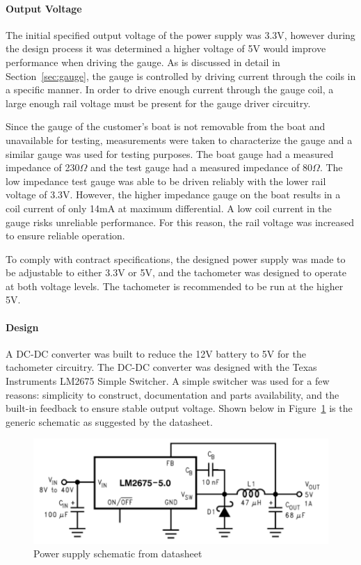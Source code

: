 \documentclass[11pt]{article}
\providecommand{\DIFaddtex}[1]{{\protect\color{blue}\uwave{#1}}} %
\providecommand{\DIFaddFL}[1]{\DIFadd{#1}} %
\providecommand{\DIFaddbeginFL}{} %
\providecommand{\DIFaddendFL}{} %
\providecommand{\DIFadd}[1]{\texorpdfstring{\DIFaddtex{#1}}{#1}} %
\newcommand{\DIFaddincludegraphics}[2][]{{\color{blue}\fbox{\DIFOincludegraphics[#1]{#2}}}} %
\DeclareRobustCommand{\DIFaddbeginFL}{\DIFOaddbeginFL \let\includegraphics\DIFaddincludegraphics} %
\DeclareRobustCommand{\DIFaddendFL}{\DIFOaddendFL \let\includegraphics\DIFOincludegraphics} %
\begin{document}
\paragraph{Output Voltage}
The initial specified output voltage of the power supply was 3.3V, however during the design process it was determined a higher voltage of 5V would improve performance when driving the gauge. As is discussed in detail in Section~\ref{sec:gauge}, the gauge is controlled by driving current through the coils in a specific manner. In order to drive enough current through the gauge coil, a large enough rail voltage must be present for the gauge driver circuitry. 

Since the gauge of the customer's boat is not removable from the boat and unavailable for testing, measurements were taken to characterize the gauge and a similar gauge was used for testing purposes. The boat gauge had a measured impedance of 230$\Omega$ and the test gauge had a measured impedance of 80$\Omega$. The low impedance test gauge was able to be driven reliably with the lower rail voltage of 3.3V. However, the higher impedance gauge on the boat results in a coil current of only 14mA at maximum differential. A low coil current in the gauge risks unreliable performance. For this reason, the rail voltage was increased to ensure reliable operation.

To comply with contract specifications, the designed power supply was made to be adjustable to either 3.3V or 5V, and the tachometer was designed to operate at both voltage levels. The tachometer is recommended to be run at the higher 5V.

\paragraph{Design}
A DC-DC converter was built to reduce the 12V battery to 5V for the tachometer circuitry. The DC-DC converter was designed with the Texas Instruments LM2675 Simple Switcher. A simple switcher was used for a few reasons: simplicity to construct, documentation and parts availability, and the built-in feedback to ensure stable output voltage. Shown below in Figure~\ref{fig:lm2675_ps} is the generic schematic as suggested by the datasheet. 

\begin{figure}[H]
    \centering
    \includegraphics[width=.75\textwidth]{lm2675_schem}
    \caption{Power supply schematic from datasheet\DIFaddbeginFL \DIFaddFL{~\mbox{%
\cite{lm2675}}%
}\DIFaddendFL }
    \label{fig:lm2675_ps}
\end{figure}
\end{document}
